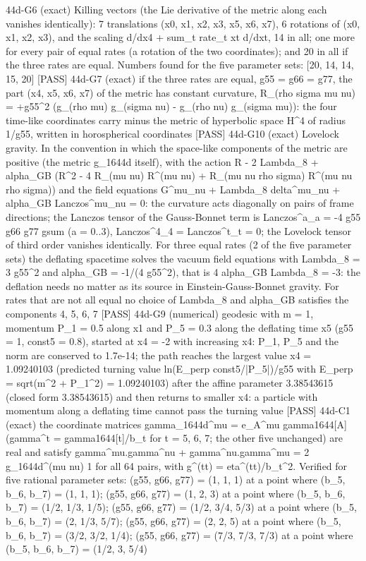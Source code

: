 \documentclass[
  10pt,
]{article}
\newenvironment{Shaded}{}{}
\newcommand{\NormalTok}[1]{#1}
\begin{document}
\begin{Shaded}
\begin{Highlighting}[]
\NormalTok{[PASS] 44d{-}G6  (exact) Killing vectors (the Lie derivative of the metric along each vanishes identically): 7 translations (x0, x1, x2, x3, x5, x6, x7), 6 rotations of (x0, x1, x2, x3), and the scaling d/dx4 + sum\_t rate\_t xt d/dxt, 14 in all; one more for every pair of equal rates (a rotation of the two coordinates); and 20 in all if the three rates are equal. Numbers found for the five parameter sets: [20, 14, 14, 15, 20]}
\NormalTok{[PASS] 44d{-}G7  (exact) if the three rates are equal, g55 = g66 = g77, the part (x4, x5, x6, x7) of the metric has constant curvature, R\_(rho sigma mu nu) = +g55\^{}2 (g\_(rho mu) g\_(sigma nu) {-} g\_(rho nu) g\_(sigma mu)): the four time{-}like coordinates carry minus the metric of hyperbolic space H\^{}4 of radius 1/g55, written in horospherical coordinates}
\NormalTok{[PASS] 44d{-}G10  (exact) Lovelock gravity. In the convention in which the space{-}like components of the metric are positive (the metric g\_1644d itself), with the action R {-} 2 Lambda\_8 + alpha\_GB (R\^{}2 {-} 4 R\_(mu nu) R\^{}(mu nu) + R\_(mu nu rho sigma) R\^{}(mu nu rho sigma)) and the field equations G\^{}mu\_nu + Lambda\_8 delta\^{}mu\_nu + alpha\_GB Lanczos\^{}mu\_nu = 0: the curvature acts diagonally on pairs of frame directions; the Lanczos tensor of the Gauss{-}Bonnet term is Lanczos\^{}a\_a = {-}4 g55 g66 g77 gsum (a = 0..3), Lanczos\^{}4\_4 = Lanczos\^{}t\_t = 0; the Lovelock tensor of third order vanishes identically. For three equal rates (2 of the five parameter sets) the deflating spacetime solves the vacuum field equations with Lambda\_8 = 3 g55\^{}2 and alpha\_GB = {-}1/(4 g55\^{}2), that is 4 alpha\_GB Lambda\_8 = {-}3: the deflation needs no matter as its source in Einstein{-}Gauss{-}Bonnet gravity. For rates that are not all equal no choice of Lambda\_8 and alpha\_GB satisfies the components 4, 5, 6, 7}
\NormalTok{[PASS] 44d{-}G9  (numerical) geodesic with m = 1, momentum P\_1 = 0.5 along x1 and P\_5 = 0.3 along the deflating time x5 (g55 = 1, const5 = 0.8), started at x4 = {-}2 with increasing x4: P\_1, P\_5 and the norm are conserved to 1.7e{-}14; the path reaches the largest value x4 = 1.09240103 (predicted turning value ln(E\_perp const5/|P\_5|)/g55 with E\_perp = sqrt(m\^{}2 + P\_1\^{}2) = 1.09240103) after the affine parameter 3.38543615 (closed form 3.38543615) and then returns to smaller x4: a particle with momentum along a deflating time cannot pass the turning value}
\NormalTok{[PASS] 44d{-}C1  (exact) the coordinate matrices gamma\_1644d\^{}mu = e\_A\^{}mu gamma1644[A] (gamma\^{}t = gamma1644[t]/b\_t for t = 5, 6, 7; the other five unchanged) are real and satisfy gamma\^{}mu.gamma\^{}nu + gamma\^{}nu.gamma\^{}mu = 2 g\_1644d\^{}(mu nu) 1 for all 64 pairs, with g\^{}(tt) = eta\^{}(tt)/b\_t\^{}2. Verified for five rational parameter sets: (g55, g66, g77) = (1, 1, 1) at a point where (b\_5, b\_6, b\_7) = (1, 1, 1); (g55, g66, g77) = (1, 2, 3) at a point where (b\_5, b\_6, b\_7) = (1/2, 1/3, 1/5); (g55, g66, g77) = (1/2, 3/4, 5/3) at a point where (b\_5, b\_6, b\_7) = (2, 1/3, 5/7); (g55, g66, g77) = (2, 2, 5) at a point where (b\_5, b\_6, b\_7) = (3/2, 3/2, 1/4); (g55, g66, g77) = (7/3, 7/3, 7/3) at a point where (b\_5, b\_6, b\_7) = (1/2, 3, 5/4)}

\end{Highlighting}
\end{Shaded}
\end{document}
